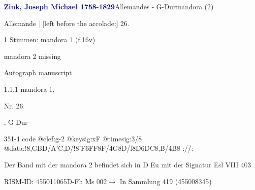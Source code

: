 \documentclass[twocolumn]{book}
\begin{document}
\par \vspace{7pt} \textcolor{darkblue}{\textbf{Zink, Joseph Michael  1758-1829}}\hfillplus{\textbf{[351]}}\newline Allemandes - G-Dur\newline mandora (2)
\par \begin{itshape}[f.16v, at left:] Allemande | [left before the accolade:] 26.\end{itshape} 
\par \textcolor{darkblue}{}  1 Stimmen: mandora 1  (f.16v)\newline \begin{small} mandora 2 missing\end{small} \newline Autograph manuscript
\par 1.1.1  mandora 1, \begin{itshape}Nr. 26.\end{itshape}, G-Dur  
\begin{filecontents*}{351-1.code}
@clef:g-2
@keysig:xF
@timesig:3/8
@data:!8,GBD/A'C,D/!{8'F6FF8F}/4G8D/f{8D6DC8,B}/4B8-://:
\end{filecontents*}
\newline
%
\par Der Band mit der mandora 2 befindet sich in D Eu mit der Signatur Esl VIII 403
\par RISM-ID: 455011065\newline D-Fh  Ms 002\newline $\rightarrow$ In Sammlung 419 (455008345)
      
\end{document}
